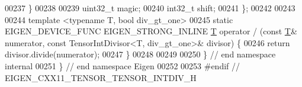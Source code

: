 \begin{DoxyCode}
00237   \}
00238 
00239   uint32\_t magic;
00240   int32\_t shift;
00241 \};
00242 
00243 
00244 \textcolor{keyword}{template} <\textcolor{keyword}{typename} T, \textcolor{keywordtype}{bool} div\_gt\_one>
00245 \textcolor{keyword}{static} EIGEN\_DEVICE\_FUNC EIGEN\_STRONG\_INLINE \hyperlink{group___sparse_core___module_class_eigen_1_1_triplet}{T} operator / (\textcolor{keyword}{const} \hyperlink{group___sparse_core___module_class_eigen_1_1_triplet}{T}& numerator, \textcolor{keyword}{const} TensorIntDivisor<T,
       div\_gt\_one>& divisor) \{
00246   \textcolor{keywordflow}{return} divisor.divide(numerator);
00247 \}
00248 
00249 
00250 \} \textcolor{comment}{// end namespace internal}
00251 \} \textcolor{comment}{// end namespace Eigen}
00252 
00253 \textcolor{preprocessor}{#endif // EIGEN\_CXX11\_TENSOR\_TENSOR\_INTDIV\_H}
\end{DoxyCode}
